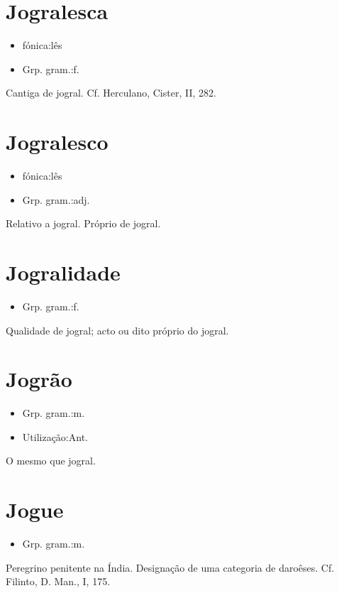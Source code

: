\documentclass{article}
\begin{document}
\section{Jogralesca}
\begin{itemize}
\item {fónica:lês}
\end{itemize}
\begin{itemize}
\item {Grp. gram.:f.}
\end{itemize}
Cantiga de jogral. Cf. Herculano, \textunderscore Cister\textunderscore , II, 282.
\section{Jogralesco}
\begin{itemize}
\item {fónica:lês}
\end{itemize}
\begin{itemize}
\item {Grp. gram.:adj.}
\end{itemize}
Relativo a jogral.
Próprio de jogral.
\section{Jogralidade}
\begin{itemize}
\item {Grp. gram.:f.}
\end{itemize}
Qualidade de jogral; acto ou dito próprio do jogral.
\section{Jogrão}
\begin{itemize}
\item {Grp. gram.:m.}
\end{itemize}
\begin{itemize}
\item {Utilização:Ant.}
\end{itemize}
O mesmo que \textunderscore jogral\textunderscore .
\section{Jogue}
\begin{itemize}
\item {Grp. gram.:m.}
\end{itemize}
Peregrino penitente na Índia.
Designação de uma categoria de daroêses. Cf. Filinto, \textunderscore D. Man.\textunderscore , I, 175.
\end{document}
